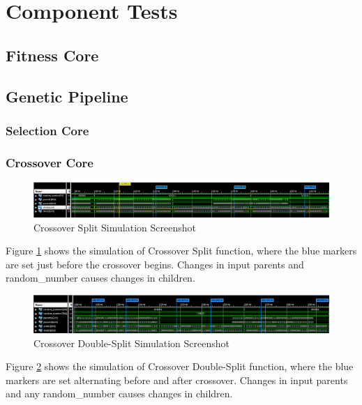 \section{Component Tests}

\subsection{Fitness Core}

\subsection{Genetic Pipeline}

\subsubsection{Selection Core}
\subsubsection{Crossover Core} 
\begin{figure}[H]
\includegraphics[width=\textwidth]{fpga/fig/testbenches/crossover_split_simulation1.png}
\caption{Crossover Split Simulation Screenshot}
\label{fig_crossover_split_testbench}
\end{figure}

Figure \ref{fig_crossover_split_testbench} shows the simulation of Crossover Split function, where the blue markers are set just before the crossover begins. 
Changes in input parents and random\_number causes changes in children. 

\begin{figure}[H]
\includegraphics[width=\textwidth]{fpga/fig/testbenches/crossover_doublesplit_simulation1.png}
\caption{Crossover Double-Split Simulation Screenshot}
\label{fig_crossover_doublesplit_testbench}
\end{figure}

Figure \ref{fig_crossover_doublesplit_testbench} shows the simulation of Crossover Double-Split function, where the blue markers are set alternating before and after crossover.
Changes in input parents and any random\_number causes changes in children. 

